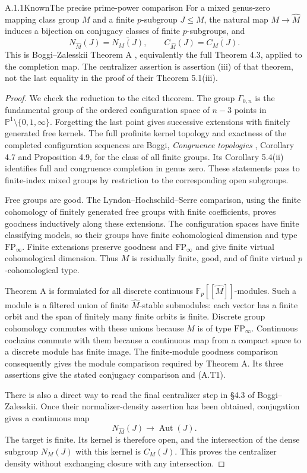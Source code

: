 \begin{result}{A.1.1}{Known}{The precise prime-power comparison}
For a mixed genus-zero mapping class group $M$ and a finite
$p$-subgroup $J\leq M$, the natural map $M\to\widehat M$ induces
a bijection on conjugacy classes of finite $p$-subgroups, and
\[
 N_{\widehat M}(J)=\overline{N_M(J)},\qquad
 C_{\widehat M}(J)=\overline{C_M(J)}.                    \tag{A.T1}
\]
This is Boggi--Zalesskii Theorem A \cite{CA_BZ2025}, equivalently the full
Theorem 4.3, applied to the completion map.  The centralizer assertion
is assertion (iii) of that theorem, not the last equality in the proof
of their Theorem 5.1(iii).
\end{result}
\begin{proof}
We check the reduction to the cited theorem.  The group
$\Gamma_{0,n}$ is the fundamental group of the ordered configuration
space of $n-3$ points in $\mathbb P^1\setminus\{0,1,\infty\}$.
Forgetting the last point gives successive extensions with finitely
generated free kernels.  The full profinite kernel topology and
exactness of the completed configuration sequences are
Boggi, \emph{Congruence topologies} \cite{CA_Boggi2020}, Corollary 4.7 and
Proposition 4.9, for the class of all finite groups.  Its
Corollary 5.4(ii) identifies full and congruence completion in genus
zero.  These statements pass to finite-index mixed groups by
restriction to the corresponding open subgroups.

Free groups are good.  The Lyndon--Hochschild--Serre comparison,
using the finite cohomology of finitely generated free groups with
finite coefficients, proves goodness inductively along these
extensions.  The configuration spaces have finite classifying
models, so their groups have finite cohomological dimension and type
$\mathrm{FP}_\infty$.  Finite extensions preserve goodness and
$\mathrm{FP}_\infty$ and give finite virtual cohomological dimension.
Thus $M$ is residually finite, good, and of finite virtual
$p$-cohomological type.

Theorem A is formulated for all discrete continuous
$\mathbb F_p[[\widehat M]]$-modules.  Such a module is a filtered
union of finite $\widehat M$-stable submodules: each vector has a
finite orbit and the span of finitely many finite orbits is finite.
Discrete group cohomology commutes with these unions because $M$ is
of type $\mathrm{FP}_\infty$.  Continuous cochains commute with them
because a continuous map from a compact space to a discrete module
has finite image.  The finite-module goodness comparison consequently
gives the module comparison required by Theorem A.  Its three
assertions give the stated conjugacy comparison and (A.T1).

There is also a direct way to read the final centralizer step in
\S4.3 of Boggi--Zalesskii.  Once their normalizer-density assertion
has been obtained, conjugation gives a continuous map
\[
 N_{\widehat M}(J)\longrightarrow\operatorname{Aut}(J).
\]
The target is finite.  Its kernel is therefore open, and the
intersection of the dense subgroup $N_M(J)$ with this kernel is
$C_M(J)$.  This proves the centralizer density without exchanging
closure with any intersection.
\end{proof}

